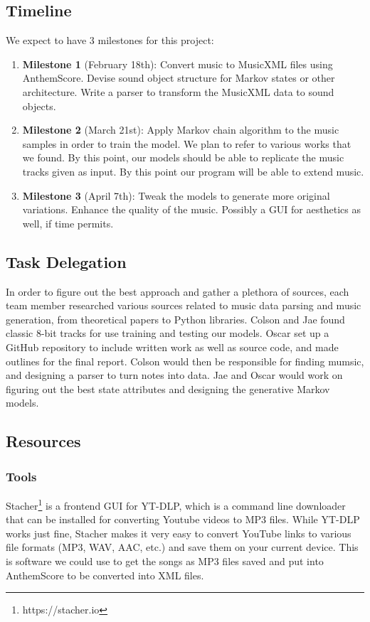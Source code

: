 \documentclass{article}
\begin{document}
\subsection{Timeline}
We expect to have 3 milestones for this project:
\begin{enumerate}
  \item \textbf{Milestone 1} (February 18th): Convert music to MusicXML files using AnthemScore. Devise sound object structure for Markov states or other architecture. 
  Write a parser to transform the MusicXML data to sound objects. 
  \item \textbf{Milestone 2} (March 21st): Apply Markov chain algorithm to the music samples in order to train the model. We plan to refer to various works that we found.
  By this point, our models should be able to replicate the music tracks given as input. By this point our program will be able to extend music.
  \item \textbf{Milestone 3} (April 7th): Tweak the models to generate more original variations. Enhance the quality of the music. Possibly a GUI for aesthetics as well, 
  if time permits.
\end{enumerate}

\subsection{Task Delegation}
In order to figure out the best approach and gather a plethora of sources, each team member researched various sources related to music data parsing and music generation, 
from theoretical papers to Python libraries. Colson and Jae found classic 8-bit tracks for use training and testing our models. Oscar set up a GitHub repository to include 
written work as well as source code, and made outlines for the final report. Colson would then be responsible for finding mumsic, and designing a parser to turn notes into 
data. Jae and Oscar would work on figuring out the best state attributes and designing the generative Markov models. 

\subsection{Resources}
\subsubsection{Tools}
Stacher\footnote{https://stacher.io} is a frontend GUI for YT-DLP, which is a command line downloader that can be installed for converting Youtube videos to MP3 files.
While YT-DLP works just fine, Stacher makes it very easy to convert YouTube links to various file formats (MP3, WAV, AAC, etc.) and save them on your current device. This 
is software we could use to get the songs as MP3 files saved and put into AnthemScore to be converted into XML files.
\end{document}
